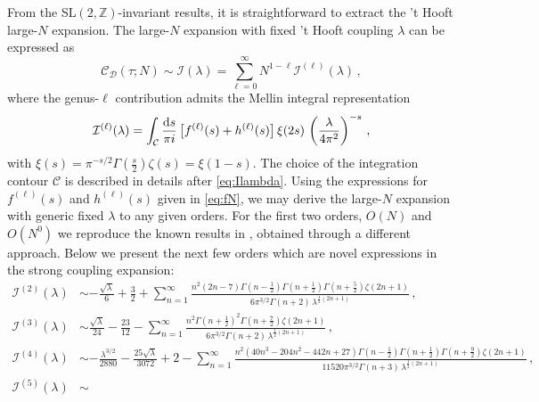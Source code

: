 \documentclass[aps,prl,twocolumn, longbibliography,footinbib,superscriptaddress, preprintnumbers]{revtex4-1}
\newcommand{\<}{\langle}
\renewcommand{\>}{\rangle}
\begin{document}
{From the SL$(2, \mathbb{Z})$-invariant results, it is straightforward to extract the 't Hooft large-$N$ expansion. The large-$N$ expansion with fixed 't Hooft coupling $\lambda$ can be expressed as
\begin{equation}
\mathcal{C}_{\mathcal{D}}(\tau; N) \sim\mathcal{I}(\lambda) =  \sum_{\ell=0}^\infty N^{1-\ell} \mathcal{I}^{(\ell)}(\lambda)\,,
\end{equation}
where the genus-$\ell$ contribution admits the Mellin integral representation
\begin{equation} \label{eq:IMell}
\mathcal{I}^{(\ell)}(\lambda)= \int_{\mathcal{C}}  \frac{{\rm d} s}{\pi i} \, \big[f^{(\ell)}(s) + h^{(\ell)}(s) \big] \, \xi(2s)\, \left( \frac{\lambda}{4\pi^2} \right)^{-s} \,,
\end{equation}
with $\xi(s) = \pi^{-s/2}\Gamma(\frac{s}{2})\zeta(s)=\xi(1-s)$. The choice of the integration contour $\mathcal{C}$ is described in details after \eqref{eq:Ilambda}.
Using the expressions for $f^{(\ell)}(s)$ and $h^{(\ell)}(s)$ given in \eqref{eq:fN}, we may derive the large-$N$ expansion with generic fixed $\lambda$ to any given orders.  For the first two orders, $O(N)$ and $O(N^0)$ we reproduce the known results in  \cite{Brown:2024tru}, obtained through a different approach. Below we present the next few orders which are novel expressions in the strong coupling expansion:
\begin{align}
     \mathcal{I}^{(2)}  (\lambda) &\sim -\frac{\sqrt{\lambda }}{6} + \frac{3}{2} + \sum_{n=1}^{\infty} \frac{n^2 (2 n{-}7)  \Gamma
   \left(n{-}\frac{1}{2}\right) \Gamma \left(n {+}\frac{1}{2}\right) \Gamma
   \left(n {+} \frac{5}{2}\right)  \zeta (2 n{+}1)}{6 \pi ^{3/2} \Gamma (n{+}2)\, \lambda ^{\frac{1}{2} (2 n+1)}}\, , \\
    \mathcal{I}^{(3)}  (\lambda) &\sim \frac{\sqrt{\lambda }}{24} -\frac{23}{12} - \sum_{n=1}^{\infty} \frac{n^2  \Gamma \left(n{+}\frac{1}{2}\right)^2
   \Gamma \left(n{+}\frac{7}{2}\right) \zeta (2 n{+}1)}{6 \pi ^{3/2} \Gamma (n{+}2) \, \lambda ^{\frac{1}{2} (2 n+1)}} \, ,  \\
 \mathcal{I}^{(4)}  (\lambda) &\sim -\frac{\lambda ^{3/2}}{2880} -\frac{25 \sqrt{\lambda }}{3072} +
   2-\sum_{n=1}^{\infty} \frac{n^2 \left(40 n^3 {-}204 n^2{-}442 n {+} 27\right)
   \Gamma \left(n{-}\frac{1}{2}\right) \Gamma \left(n{+}\frac{1}{2}\right) \Gamma
   \left(n{+}\frac{9}{2}\right)\zeta (2 n{+}1)}{11520 \pi ^{3/2} \Gamma (n{+}3)\, \lambda ^{\frac{1}{2} (2 n+1)}}  \, ,  \\
 \mathcal{I}^{(5)}  (\lambda) &\sim

\end{align}}
\end{document}
